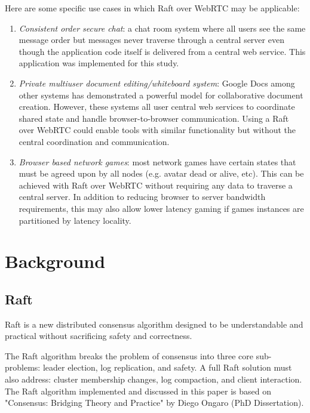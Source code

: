 \documentclass[9pt]{extarticle}
\begin{document}
\begin{multicols}{2}
Here are some specific use cases in which Raft over WebRTC may be
applicable:

\begin{enumerate}
\item \emph{Consistent order secure chat}: a chat room system where all users see the same message order but messages never traverse through a central server even though the application code itself is delivered from a central web service. This application was implemented for this study.
\item \emph{Private multiuser document editing/whiteboard system}: Google Docs among other systems has demonstrated a powerful model for collaborative document creation. However, these systems all user central web services to coordinate shared state and handle browser-to-browser communication. Using a Raft over WebRTC could enable tools with similar functionality but without the central coordination and communication.
\item \emph{Browser based network games}: most network games have certain states that must be agreed upon by all nodes (e.g. avatar dead or alive, etc). This can be achieved with Raft over WebRTC without requiring any data to traverse a central server. In addition to reducing browser to server bandwidth requirements, this may also allow lower latency gaming if games instances are partitioned by latency locality.
\end{enumerate}

\section{Background}

\subsection{Raft}

Raft is a new distributed consensus algorithm designed to be
understandable and practical without sacrificing safety and
correctness.

The Raft algorithm breaks the problem of consensus into three core
sub-problems: leader election, log replication, and safety. A full Raft
solution must also address: cluster membership changes, log
compaction, and client interaction. The Raft algorithm implemented and
discussed in this paper is based on "Consensus: Bridging Theory and
Practice" by Diego Ongaro (PhD Dissertation). %


\end{multicols}
\end{document}
